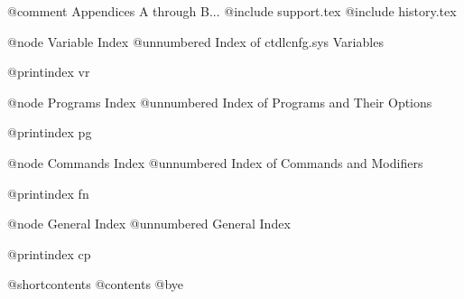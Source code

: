 @comment Appendices A through B...
@include support.tex
@include history.tex

@node Variable Index
@unnumbered Index of ctdlcnfg.sys Variables

@printindex vr

@node Programs Index
@unnumbered Index of Programs and Their Options

@printindex pg

@node Commands Index
@unnumbered Index of Commands and Modifiers

@printindex fn

@node General Index
@unnumbered General Index

@printindex cp

@shortcontents
@contents
@bye
